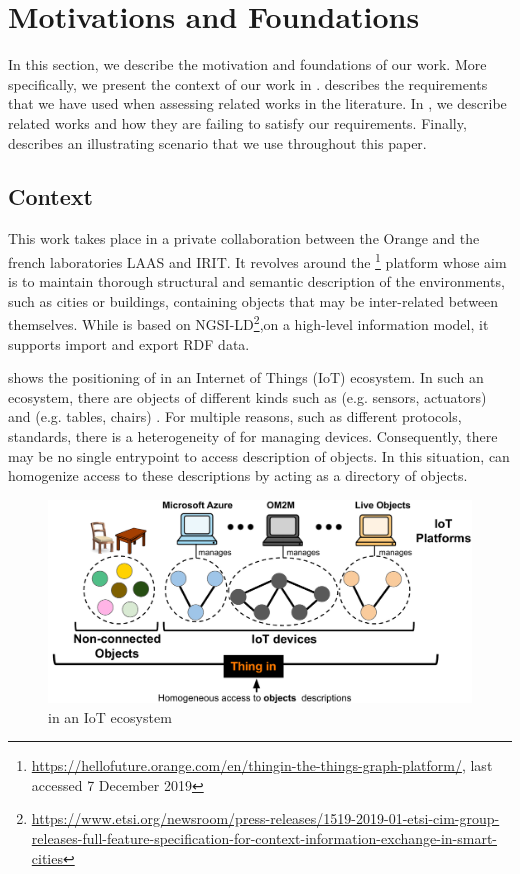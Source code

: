 \section{Motivations and Foundations}\label{sec:foundationMotivation}
In this section, we describe the motivation and foundations of our work. More specifically, we present the context of our work in .  describes the requirements that we have used when assessing related works in the literature. In , we describe related works and how they are failing to satisfy our requirements. Finally,  describes an illustrating scenario that we use throughout this paper.  

\subsection{Context}\label{sec:context}
This work takes place in a private collaboration between the Orange and the french laboratories LAAS and IRIT. It revolves around the \thingin\footnote{\url{https://hellofuture.orange.com/en/thingin-the-things-graph-platform/}, last accessed 7 December 2019} platform whose aim is to maintain thorough structural and semantic description of the environments, such as cities or buildings, containing objects that may be inter-related between themselves. While \thingin is based on NGSI-LD\footnote{\url{https://www.etsi.org/newsroom/press-releases/1519-2019-01-etsi-cim-group-releases-full-feature-specification-for-context-information-exchange-in-smart-cities}},on a high-level information model, it supports import and export RDF data.

 shows the positioning of \thingin in an Internet of Things (IoT) ecosystem. In such an ecosystem, there are objects of different kinds such as  (e.g. sensors, actuators) and  (e.g. tables, chairs) . For multiple reasons, such as different protocols, standards, there is a heterogeneity of  for managing  devices. Consequently, there may be no single entrypoint to access description of objects. In this situation, \thingin can homogenize access to these descriptions by acting as a directory of objects.

\begin{figure}[h]
	\centering
	\includegraphics[scale=0.5]{images/contextThingIn.pdf}
	\caption{\thingin in an IoT ecosystem}
	\label{fig:contextThingIn}
\end{figure}

